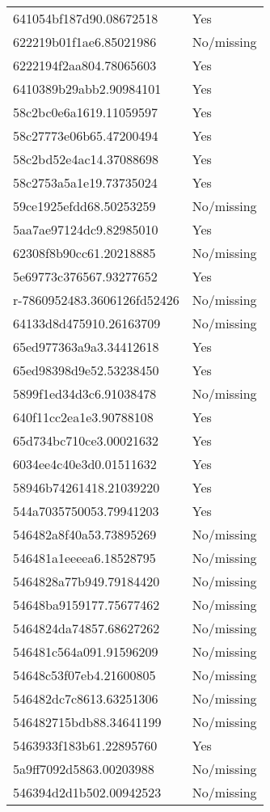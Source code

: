 \begin{tabular}{ll}
641054bf187d90.08672518 & Yes \\
622219b01f1ae6.85021986 & No/missing \\
6222194f2aa804.78065603 & Yes \\
6410389b29abb2.90984101 & Yes \\
58c2bc0e6a1619.11059597 & Yes \\
58c27773e06b65.47200494 & Yes \\
58c2bd52e4ac14.37088698 & Yes \\
58c2753a5a1e19.73735024 & Yes \\
59ce1925efdd68.50253259 & No/missing \\
5aa7ae97124dc9.82985010 & Yes \\
62308f8b90cc61.20218885 & No/missing \\
5e69773c376567.93277652 & Yes \\
r-7860952483.3606126fd52426 & No/missing \\
64133d8d475910.26163709 & No/missing \\
65ed977363a9a3.34412618 & Yes \\
65ed98398d9e52.53238450 & Yes \\
5899f1ed34d3c6.91038478 & No/missing \\
640f11cc2ea1e3.90788108 & Yes \\
65d734bc710ce3.00021632 & Yes \\
6034ee4c40e3d0.01511632 & Yes \\
58946b74261418.21039220 & Yes \\
544a7035750053.79941203 & Yes \\
546482a8f40a53.73895269 & No/missing \\
546481a1eeeea6.18528795 & No/missing \\
5464828a77b949.79184420 & No/missing \\
54648ba9159177.75677462 & No/missing \\
5464824da74857.68627262 & No/missing \\
546481c564a091.91596209 & No/missing \\
54648c53f07eb4.21600805 & No/missing \\
546482dc7c8613.63251306 & No/missing \\
546482715bdb88.34641199 & No/missing \\
5463933f183b61.22895760 & Yes \\
5a9ff7092d5863.00203988 & No/missing \\
546394d2d1b502.00942523 & No/missing \\

\end{tabular}
